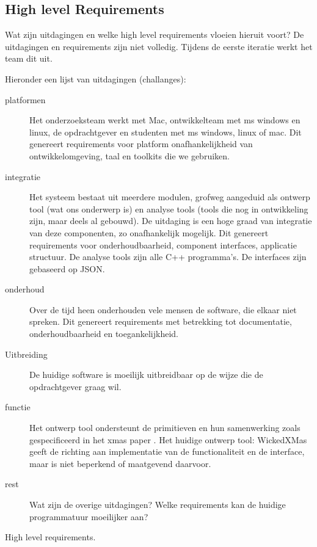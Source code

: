\documentclass[a4paper,11pt,twoside,draft]{article}
\begin{document}
\subsection{High level Requirements}

Wat zijn uitdagingen en welke high level requirements vloeien hieruit voort? De uitdagingen en requirements
zijn niet volledig. Tijdens de eerste iteratie werkt het team dit uit.

Hieronder een lijst van uitdagingen (challanges):

\begin{description}
 \item[platformen] Het onderzoeksteam werkt met Mac, ontwikkelteam met ms windows en linux, de opdrachtgever en studenten met ms windows, linux of mac.
		    Dit genereert requirements voor platform onafhankelijkheid van ontwikkelomgeving, taal en toolkits die we gebruiken.
 \item[integratie] Het systeem bestaat uit meerdere modulen, grofweg aangeduid als ontwerp tool (wat ons onderwerp is) en analyse tools (tools die nog
		    in ontwikkeling zijn, maar deels al gebouwd). De uitdaging is een hoge graad van integratie van deze componenten, zo onafhankelijk mogelijk.
		    Dit genereert requirements voor onderhoudbaarheid, component interfaces, applicatie structuur. De analyse tools zijn alle C++ programma's.
		    De interfaces zijn gebaseerd op JSON.
 \item[onderhoud] Over de tijd heen onderhouden vele mensen de software, die elkaar niet spreken. Dit genereert requirements met betrekking tot documentatie,
		    onderhoudbaarheid en toegankelijkheid.
 \item[Uitbreiding] De huidige software is moeilijk uitbreidbaar op de wijze die de opdrachtgever graag wil.
 \item[functie] Het ontwerp tool ondersteunt de primitieven en hun samenwerking zoals gespecificeerd in het xmas paper \cite{chatterjee-kishinevsky:xmas}.
		Het  huidige ontwerp tool: WickedXMas geeft de richting aan implementatie van de functionaliteit en de interface, maar is
		niet beperkend of maatgevend daarvoor.
 \item[rest]	Wat zijn de overige uitdagingen? Welke requirements kan de huidige programmatuur moeilijker aan?
\end{description}

High level requirements.
\end{document}
